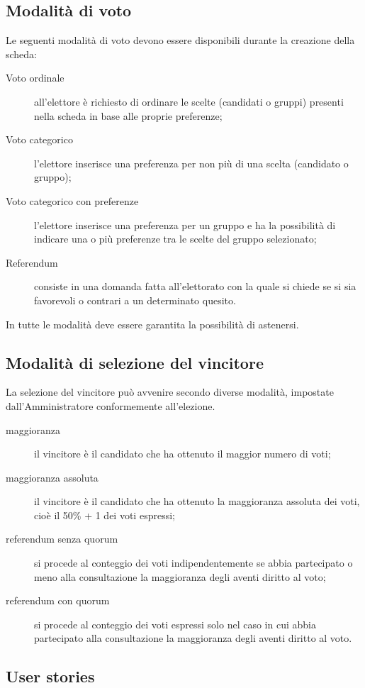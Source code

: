 \documentclass{report}
\begin{document}
\subsection{Modalità di voto}
Le seguenti modalità di voto devono essere disponibili durante la creazione della scheda:
\begin{description}
	\item[Voto ordinale] all'elettore è richiesto di ordinare le scelte (candidati o gruppi) presenti nella scheda in base alle proprie preferenze;
	\item[Voto categorico] l'elettore inserisce una preferenza per non più di una scelta (candidato o gruppo);
	\item[Voto categorico con preferenze] l'elettore inserisce una preferenza per un gruppo e ha la possibilità di indicare una o più preferenze tra le scelte del gruppo selezionato;
	\item[Referendum] consiste in una domanda fatta all'elettorato con la quale si chiede se si sia favorevoli o contrari a un determinato quesito.
\end{description}

In tutte le modalità deve essere garantita la possibilità di astenersi.


\subsection{Modalità di selezione del vincitore}
La selezione del vincitore può avvenire secondo diverse modalità, impostate dall'Amministratore conformemente all'elezione.
\begin{description}
	\item[maggioranza] il vincitore è il candidato che ha ottenuto il maggior numero di voti;
	\item[maggioranza assoluta] il vincitore è il candidato che ha ottenuto la maggioranza assoluta dei voti, cioè il 50\% + 1 dei voti espressi;
	\item[referendum senza quorum] si procede al conteggio dei voti indipendentemente se abbia partecipato o meno alla consultazione la maggioranza degli aventi diritto al voto; 
	\item[referendum con quorum] si procede al conteggio dei voti espressi solo nel caso in cui abbia partecipato alla consultazione la maggioranza degli aventi diritto al voto.
\end{description}


\subsection{User stories}
\end{document}
